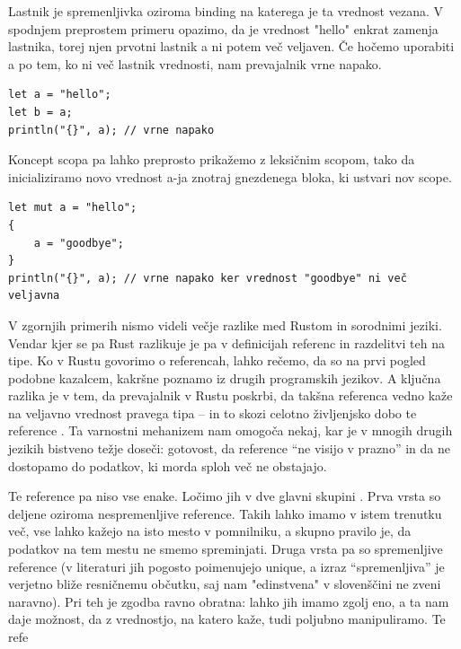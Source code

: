 \documentclass{article}
\begin{document}
Lastnik je spremenljivka oziroma binding na katerega je ta vrednost vezana. V spodnjem preprostem
primeru opazimo, da je vrednost "hello" enkrat zamenja lastnika, torej njen prvotni lastnik a ni
potem več veljaven. Če hočemo uporabiti a po tem, ko ni več lastnik vrednosti, nam prevajalnik vrne napako.

\begin{lstlisting}
let a = "hello";
let b = a;
println("{}", a); // vrne napako
\end{lstlisting}

Koncept scopa pa lahko preprosto prikažemo z leksičnim scopom, tako da inicializiramo novo vrednost a-ja
znotraj gnezdenega bloka, ki ustvari nov scope.

\begin{lstlisting}
let mut a = "hello";
{
    a = "goodbye";
}
println("{}", a); // vrne napako ker vrednost "goodbye" ni več veljavna
\end{lstlisting}


V zgornjih primerih nismo videli večje razlike med Rustom in sorodnimi jeziki. Vendar kjer se pa Rust razlikuje
je pa v definicijah referenc in razdelitvi teh na tipe. Ko v Rustu govorimo o referencah, lahko rečemo, da so na
prvi pogled podobne kazalcem, kakršne poznamo iz drugih programskih jezikov. A ključna razlika je v tem, da prevajalnik
v Rustu poskrbi, da takšna referenca vedno kaže na veljavno vrednost pravega tipa – in to skozi celotno življenjsko
dobo te reference \cite{klabnikRustProgrammingLanguage2023}. Ta varnostni mehanizem nam omogoča nekaj, kar je v
mnogih drugih jezikih bistveno težje doseči: gotovost, da reference “ne visijo v prazno” in da ne dostopamo do
podatkov, ki morda sploh več ne obstajajo.

Te reference pa niso vse enake. Ločimo jih v dve glavni skupini \cite{crichtonGroundedConceptualModel2023,yanovskiGhostCellSeparatingPermissions2021,weissOxideEssenceRust2019}.
Prva vrsta so deljene oziroma nespremenljive reference. Takih lahko imamo v istem trenutku več, vse lahko kažejo
na isto mesto v pomnilniku, a skupno pravilo je, da podatkov na tem mestu ne smemo spreminjati. Druga vrsta pa so
spremenljive reference (v literaturi jih pogosto poimenujejo unique, a izraz “spremenljiva” je verjetno bliže resničnemu
občutku, saj nam "edinstvena" v slovenščini ne zveni naravno). Pri teh je zgodba ravno obratna: lahko jih imamo zgolj eno,
a ta nam daje možnost, da z vrednostjo, na katero kaže, tudi poljubno manipuliramo. Te refe
\end{document}
